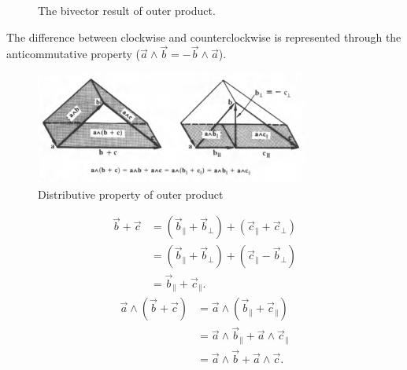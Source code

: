 \begin{figure}[H]
    \begin{center}
    \end{center}
    \caption{The bivector result of outer product.}%
    \label{fig:bivector-result}
\end{figure}

The difference between clockwise and counterclockwise is represented through the anticommutative property ($\vec{a}\wedge\vec{b}=-\vec{b}\wedge \vec{a}$).

\begin{figure}[htpb]
    \centering
    \includegraphics[width=0.8\textwidth]{figures/bivectors-dist.PNG}
    \caption{Distributive property of outer product}
    \label{fig:outer-product-distributive}
\end{figure}

\begin{align*}
    \vec{b} + \vec{c} &= (\vec{b}_\parallel+\vec{b}_\perp) + (\vec{c}_\parallel+\vec{c}_\perp) \\
    &= (\vec{b}_\parallel+\vec{b}_\perp) + (\vec{c}_\parallel-\vec{b}_\perp) \\
    &= \vec{b}_\parallel + \vec{c}_\parallel
.\end{align*}
\begin{align*}
    \vec{a} \wedge ( \vec{b} + \vec{c} ) &= \vec{a} \wedge (\vec{b}_\parallel + \vec{c}_\parallel) \\
                                         &= \vec{a} \wedge \vec{b}_\parallel + \vec{a} \wedge \vec{c}_\parallel \\
                                         &= \vec{a} \wedge \vec{b} + \vec{a} \wedge \vec{c}
.\end{align*}


